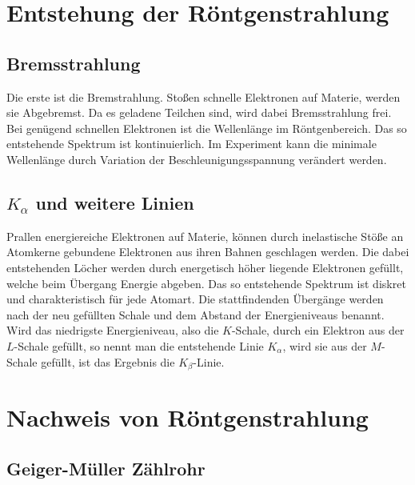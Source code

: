 \section{Entstehung der Röntgenstrahlung}


\parencite[Abschnitt~17.3.1]{meschede-gerthsen_24}

\subsection{Bremsstrahlung}

Die erste ist die Bremstrahlung. Stoßen schnelle Elektronen auf Materie,
werden sie Abgebremst. Da es geladene Teilchen sind, wird dabei
Bremsstrahlung frei. Bei genügend schnellen Elektronen ist die Wellenlänge 
im Röntgenbereich. Das so entstehende Spektrum ist kontinuierlich. Im
Experiment kann die minimale Wellenlänge durch Variation der
Beschleunigungsspannung verändert werden.

\parencite[Abschnitt~17.3.4]{meschede-gerthsen_24}

\subsection{$K_\alpha$ und weitere Linien}

Prallen energiereiche Elektronen auf Materie, können durch inelastische
Stöße an Atomkerne gebundene Elektronen aus ihren Bahnen geschlagen
werden. Die dabei entstehenden Löcher werden durch energetisch höher
liegende Elektronen gefüllt, welche beim Übergang Energie abgeben. Das so
entstehende Spektrum ist diskret und charakteristisch für jede Atomart. Die
stattfindenden Übergänge werden nach der neu gefüllten Schale und dem
Abstand der Energieniveaus benannt. Wird das niedrigste Energieniveau, also
die $K$-Schale, durch ein Elektron aus der $L$-Schale gefüllt, so nennt man
die entstehende Linie $K_\alpha$, wird sie aus der $M$-Schale gefüllt, ist
das Ergebnis die $K_\beta$-Linie.

\parencite[Abschnitt~17.3.5]{meschede-gerthsen_24}

\section{Nachweis von Röntgenstrahlung}

\subsection{Geiger-Müller Zählrohr}

